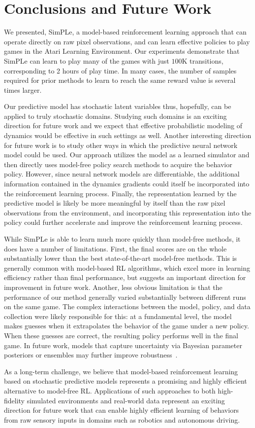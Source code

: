 \section{Conclusions and Future Work}

We presented, SimPLe, a model-based reinforcement learning approach that can operate directly on raw pixel observations, and can learn effective policies to play games in the Atari Learning Environment. Our experiments demonstrate that SimPLe can learn to play many of the games with just $100$K transitions, corresponding to 2 hours of play time. In many cases, the number of samples required for prior methods to learn to reach the same reward value is several times larger.

Our predictive model has stochastic latent variables thus, hopefully, can be applied to truly stochastic domains. Studying such domains is an exciting direction for future work and we expect that effective probabilistic modeling of dynamics would be effective in such settings as well. Another interesting direction for future work is to study other ways in which the predictive neural network model could be used. Our approach utilizes the model as a learned simulator and then directly uses model-free policy search methods to acquire the behavior policy. However, since neural network models are differentiable, the additional information contained in the dynamics gradients could itself be incorporated into the reinforcement learning process. Finally, the representation learned by the predictive model is likely be more meaningful by itself than the raw pixel observations from the environment, and incorporating this representation into the policy could further accelerate and improve the reinforcement learning process.

While SimPLe is able to learn much more quickly than model-free methods, it does have a number of limitations. First, the final scores are on the whole substantially lower than the best state-of-the-art model-free methods. This is generally common with model-based RL algorithms, which excel more in learning efficiency rather than final performance, but suggests an important direction for improvement in future work. Another, less obvious limitation is that the performance of our method generally varied substantially between different runs on the same game. The complex interactions between the model, policy, and data collection were likely responsible for this: at a fundamental level, the model makes guesses when it extrapolates the behavior of the game under a new policy. When these guesses are correct, the resulting policy performs well in the final game. In future work, models that capture uncertainty via Bayesian parameter posteriors or ensembles may further improve robustness~\cite{trpo_ensemble, Chua18}.

As a long-term challenge, we believe that model-based reinforcement learning based on stochastic predictive models represents a promising and highly efficient alternative to model-free RL. Applications of such approaches to both high-fidelity simulated environments and real-world data represent an exciting direction for future work that can enable highly efficient learning of behaviors from raw sensory inputs in domains such as robotics and autonomous driving.
